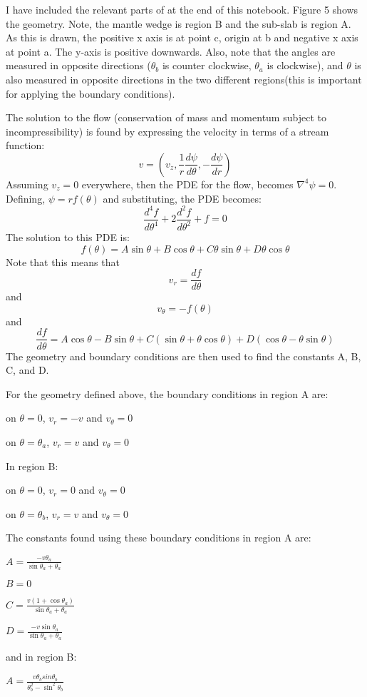 \documentclass[11pt]{article}
\begin{document}
I have included the relevant parts of \citet{mckenzie_gjras69} at the end of this
notebook. Figure 5 shows the geometry. Note, the mantle wedge is region
B and the sub-slab is region A. As this is drawn, the positive x axis is
at point c, origin at b and negative x axis at point a. The y-axis is
positive downwards. Also, note that the angles are measured in opposite
directions (\(\theta_b\) is counter clockwise, \(\theta_a\) is
clockwise), and \(\theta\) is also measured in opposite directions in
the two different regions(this is important for applying the boundary
conditions).

The solution to the flow (conservation of mass and momentum subject to
incompressibility) is found by expressing the velocity in terms of a
stream function:
\[ v = (v_z, \frac{1}{r}\frac{d\psi}{d\theta}, -\frac{d\psi}{dr})\]
Assuming \(v_z=0\) everywhere, then the PDE for the flow, becomes
\(\nabla^4\psi=0\). Defining, \(\psi = rf(\theta)\) and substituting,
the PDE becomes:
\[\frac{d^4f}{d\theta^4} + 2\frac{d^2f}{d\theta^2} + f = 0\] The
solution to this PDE is:
\[ f(\theta) = A\sin\theta + B\cos\theta + C\theta\sin\theta + D\theta\cos\theta\]
Note that this means that \[v_r = \frac{df}{d\theta}\] and
\[v_{\theta} = - f(\theta)\] and
\[\frac{df}{d\theta} = A\cos\theta -B\sin\theta + C(\sin\theta + \theta\cos\theta) + D(\cos\theta - \theta\sin\theta)\]
The geometry and boundary conditions are then used to find the constants
A, B, C, and D.

For the geometry defined above, the boundary conditions in region A are:

on \(\theta = 0\), \(v_r = -v\) and \(v_{\theta} = 0\)

on \(\theta = \theta_a\), \(v_r = v\) and \(v_{\theta} = 0\)

In region B:

on \(\theta = 0\), \(v_r = 0\) and \(v_{\theta} = 0\)

on \(\theta = \theta_b\), \(v_r = v\) and \(v_{\theta} = 0\)

The constants found using these boundary conditions in region A are:

\(A = \frac{-v\theta_a}{\sin\theta_a + \theta_a}\)

\(B = 0\)

\(C = \frac{v(1+\cos\theta_a) }{\sin\theta_a + \theta_a}\)

\(D = \frac{-v\sin\theta_a }{\sin\theta_a + \theta_a}\)

and in region B:

\(A = \frac{v \theta_b sin\theta_b}{\theta_b^2 - \sin^2\theta_b}\)
\end{document}

